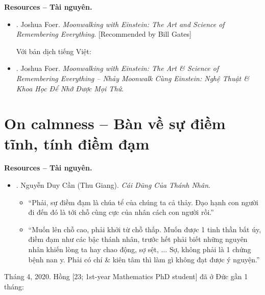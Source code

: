 \documentclass[12pt,twoside]{book}
\begin{document}
\noindent\textbf{\textsf{Resources -- Tài nguyên.}}
\begin{itemize}
	\item \cite{Foer_remember}. {\sc Joshua Foer}. {\it Moonwalking with Einstein: The Art and Science of Remembering Everything}. [Recommended by {\sc Bill Gates}]
	
	Với bản dịch tiếng Việt:
	\item \cite{Foer_remember_VN}. {\sc Joshua Foer}. {\it Moonwalking with Einstein: The Art \& Science of Remembering Everything -- Nhảy Moonwalk Cùng Einstein: Nghệ Thuật \& Khoa Học Để Nhớ Được Mọi Thứ}.
\end{itemize}

\section{On calmness -- Bàn về sự điềm tĩnh, tính điềm đạm}
{\bf \textsf{Resources -- Tài nguyên.}}
\begin{itemize}
	\item \cite{Can_dung_thanh_nhan}. {\sc Nguyễn Duy Cần (Thu Giang)}. {\it Cái Dũng Của Thánh Nhân}.
	\begin{itemize}
		\item ``Phải, sự điềm đạm là chúa tể của chúng ta cả thảy. Đạo hạnh con người đi đến đó là tới chỗ cùng cực của nhân cách con người rồi.''
		
		\item ``Muốn lên chỗ cao, phải khởi từ chỗ thấp. Muốn được 1 tinh thần bất úy, điềm đạm như các bậc thánh nhân, trước hết phải biết những nguyên nhân khiến lòng ta hay chao động, sợ sệt, $\ldots$ Sợ, không phải là 1 chứng bệnh nan y. Phải có chí \& kiên tâm thì làm gì không đạt được ý nguyện.''
	\end{itemize}
\end{itemize}
Tháng 4, 2020. {\sf Hồng [23; 1st-year Mathematics PhD student]} đã ở Đức gần 1 tháng:
\end{document}
